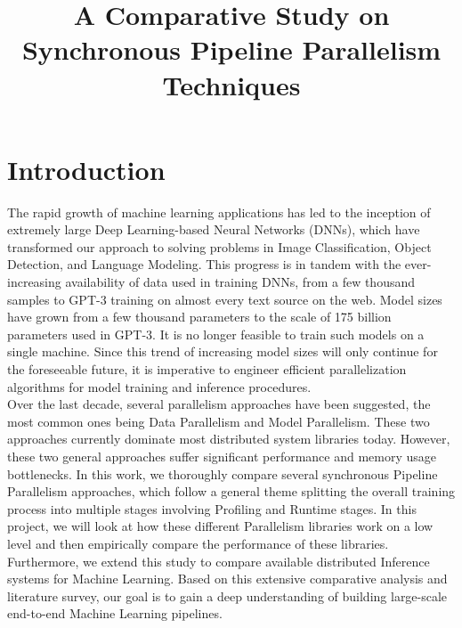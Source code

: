 \documentclass[conference]{IEEEtran}
\begin{document}
\title{A Comparative Study on Synchronous Pipeline Parallelism Techniques \\}


\author{
\and
{}
\and
{}
}
\maketitle

\section{Introduction}
The rapid growth of machine learning applications has led to the inception of extremely large Deep Learning-based Neural Networks (DNNs), which have transformed our approach to solving problems in Image Classification, Object Detection, and Language Modeling. This progress is in tandem with the ever-increasing availability of data used in training DNNs, from a few thousand samples to GPT-3 training on almost every text source on the web. Model sizes have grown from a few thousand parameters to the scale of 175 billion parameters used in GPT-3. It is no longer feasible to train such models on a single machine. Since this trend of increasing model sizes will only continue for the foreseeable future, it is imperative to engineer efficient parallelization algorithms for model training and inference procedures. \\

Over the last decade, several parallelism approaches have been suggested, the most common ones being Data Parallelism and Model Parallelism. These two approaches currently dominate most distributed system libraries today. However, these two general approaches suffer significant performance and memory usage bottlenecks. In this work, we thoroughly compare several synchronous Pipeline Parallelism approaches, which follow a general theme splitting the overall training process into multiple stages involving Profiling and Runtime stages. In this project, we will look at how these different Parallelism libraries work on a low level and then empirically compare the performance of these libraries. Furthermore, we extend this study to compare available distributed Inference systems for Machine Learning. Based on this extensive comparative analysis and literature survey, our goal is to gain a deep understanding of building large-scale end-to-end Machine Learning pipelines. 
\end{document}
